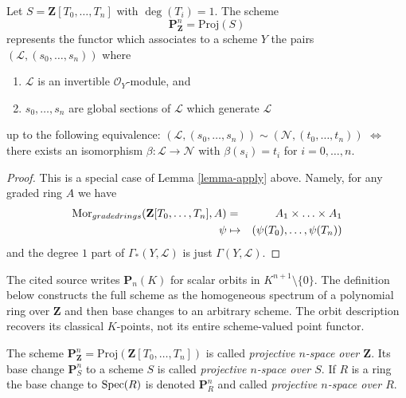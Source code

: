 \begin{lemma}
\label{lemma-projective-space}
Let $S = \mathbf{Z}[T_0, \ldots, T_n]$ with $\deg(T_i) = 1$.
The scheme
$$
\mathbf{P}^n_{\mathbf{Z}} = \text{Proj}(S)
$$
represents the functor which associates to a scheme $Y$ the pairs
$(\mathcal{L}, (s_0, \ldots, s_n))$ where
\begin{enumerate}
\item $\mathcal{L}$ is an invertible $\mathcal{O}_Y$-module, and
\item $s_0, \ldots, s_n$ are global sections of $\mathcal{L}$
which generate $\mathcal{L}$
\end{enumerate}
up to the following equivalence:
$(\mathcal{L}, (s_0, \ldots, s_n)) \sim
(\mathcal{N}, (t_0, \ldots, t_n))$ $\Leftrightarrow$ there exists
an isomorphism $\beta : \mathcal{L} \to \mathcal{N}$
with $\beta(s_i) = t_i$ for $i = 0, \ldots, n$.
\end{lemma}

\begin{proof}
This is a special case of Lemma \ref{lemma-apply} above.
Namely, for any graded ring $A$ we have
\begin{eqnarray*}
\mathop{\mathrm{Mor}}\nolimits_{graded rings}(\mathbf{Z}[T_0, \ldots, T_n], A)
& = &
A_1 \times \ldots \times A_1 \\
\psi & \mapsto & (\psi(T_0), \ldots, \psi(T_n))
\end{eqnarray*}
and the degree $1$ part of $\Gamma_*(Y, \mathcal{L})$ is
just $\Gamma(Y, \mathcal{L})$.
\end{proof}

\begin{definition}
\label{definition-projective-space}
\begin{reference}
\cite[Chapter III, \S 1, no. 51, definition of projective space,
p. 243]{FAC}
\end{reference}
\begin{history}
The cited source writes $\mathbf{P}_n(K)$ for scalar orbits in
$K^{n + 1} \setminus \{0\}$. The definition below constructs the full scheme
as the homogeneous spectrum of a polynomial ring over $\mathbf{Z}$ and then
base changes to an arbitrary scheme. The orbit description recovers its
classical $K$-points, not its entire scheme-valued point functor.
\end{history}
The scheme
$\mathbf{P}^n_{\mathbf{Z}} = \text{Proj}(\mathbf{Z}[T_0, \ldots, T_n])$
is called {\it projective $n$-space over $\mathbf{Z}$}.
Its base change $\mathbf{P}^n_S$ to a scheme $S$ is called
{\it projective $n$-space over $S$}. If $R$ is a ring the base change
to $\mathop{\mathrm{Spec}}(R)$ is denoted $\mathbf{P}^n_R$ and called
{\it projective $n$-space over $R$}.
\end{definition}

